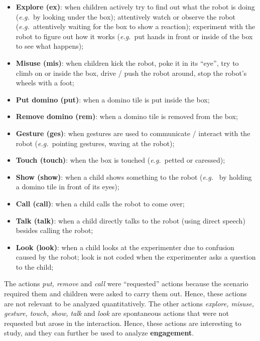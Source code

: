 \documentclass{sig-alternate}
\newcommand{\eg}{{\textit{e.g.~}}}
\begin{document}
\begin{itemize}

    \item \textbf{Explore (ex)}: when children actively try to find out what the
        robot is doing (\eg by looking under the box); attentively watch or
        observe the robot (\eg attentively waiting for the box to show a
        reaction); experiment with the robot to figure out how it works (\eg put
        hands in front or inside of the box to see what happens);

    \item \textbf{Misuse (mis)}: when children kick the robot, poke it in its
        ``eye'', try to climb on or inside the box, drive / push the robot
        around, stop the robot's wheels with a foot;\\

    \item \textbf{Put domino (put)}: when a domino tile is put inside the box;

    \item \textbf{Remove domino (rem)}: when a domino tile is removed from the
        box;

    \item \textbf{Gesture (ges)}: when gestures are used to communicate /
        interact with the robot (\eg pointing gestures, waving at the robot);

    \item \textbf{Touch (touch)}: when the box is touched (\eg petted or
        caressed);

    \item \textbf{Show (show)}: when a child shows something to the robot (\eg
        by holding a domino tile in front of its eyes);

    \item \textbf{Call (call)}: when a child calls the robot to come over;

    \item \textbf{Talk (talk)}: when a child directly talks to the robot (using
        direct speech) besides calling the robot;

    \item \textbf{Look (look)}:	when a child looks at the experimenter due to
        confusion caused by the robot; look is not coded when the experimenter
        asks a question to the child;

\end{itemize}	

The actions \textit{put, remove} and \textit{call} were ``requested'' actions
because the scenario required them and children were asked to carry them out.
Hence, these actions are not relevant to be analyzed quantitatively. The other
actions \textit{explore, misuse, gesture, touch, show, talk} and \textit{look}
are spontaneous actions that were not requested but arose in the interaction.
Hence, these actions are interesting to study, and they can further be used to
analyze \textbf{engagement}.
\end{document}

